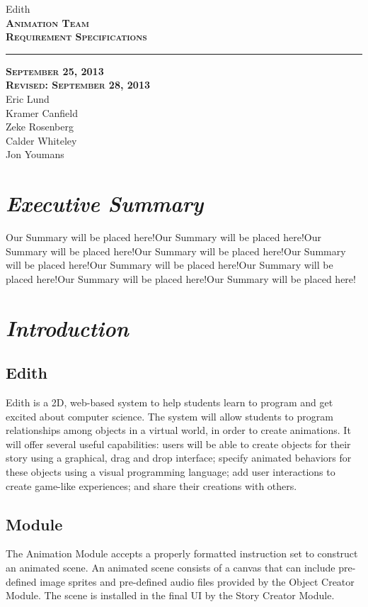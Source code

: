 \documentclass[12pt]{article}
\begin{document}
\begin{titlepage}
	\begin{center}
	\huge  Edith \\
	\vspace*{\fill}%
 	\huge \textsc{\textbf{Animation Team \\Requirement Specifications} }	
	\bigskip 
	\rule{130mm}{.1pt}
	\textsc{\textbf{September 25, 2013 \\ Revised: September 28, 2013} \\ }	
	\vspace*{\fill}%
	Eric Lund \\
	Kramer Canfield \\ 
	Zeke Rosenberg \\
	Calder Whiteley \\
	Jon Youmans
	\end{center}
	\end{titlepage}


\section{\emph{Executive Summary}}
Our Summary will be placed here!Our Summary will be placed here!Our Summary will be placed here!Our Summary will be placed here!Our Summary will be placed here!Our Summary will be placed here!Our Summary will be placed here!Our Summary will be placed here!Our Summary will be placed here!


\section{\emph{Introduction}}%
	\subsection{Edith}
         Edith is a 2D, web-based system to help students learn to program and get excited about computer science. The system will allow students to program relationships among objects in a virtual world, in order to create animations. It will offer several useful capabilities: users will be able to create objects for their story using a graphical, drag and drop interface; specify animated behaviors for these objects using a visual programming language; add user interactions to create game-like experiences; and share their creations with others. 
	\subsection{Module}
	The Animation Module accepts a properly formatted instruction set to construct an animated scene. An animated scene consists of a canvas that can include pre-defined image sprites and pre-defined audio files provided by the Object Creator Module. The scene is installed in the final UI by the Story Creator Module. 
\end{document}
